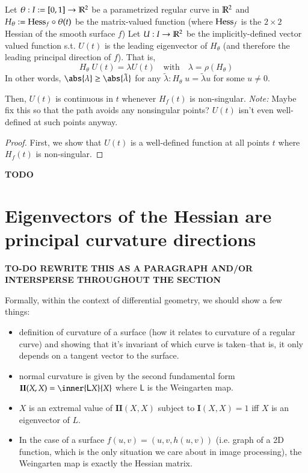         \begin{theorem}
            Let $\theta: I:= [0,1] \to \mathbb{R}^2$ be a parametrized regular curve in $\mathbb{R}^2$ and
            $H_\theta := \mathrm{Hess}_f  \circ \theta(t)$ be the matrix-valued function
            (where $\mathrm{Hess}_f$ is the $2\times 2$ Hessian of the smooth surface $f$)
            Let $U:I \to \mathbb{R}^2$ be the implicitly-defined vector valued function s.t.
            $U(t)$ is the leading eigenvector of $H_\theta$
            (and therefore the leading principal direction of $f$). That is,
            \begin{equation}
                H_\theta \; U(t) = \lambda U(t) \quad \textrm{with}\quad \lambda = \rho(H_\theta)
            \end{equation}
            In other words, $\abs{\lambda} \ge \abs{\tilde{\lambda}}$ for any
            $\tilde{\lambda} : H_\theta \; u = \tilde{\lambda} u$ for some $u \ne 0$.
            
            Then, $U(t)$ is continuous in $t$ whenever $H_f(t)$ is non-singular.
            \textit{Note:} Maybe fix this so that the path avoids any nonsingular points?
            $U(t)$ isn't even well-defined at such points anyway.
        \end{theorem}
        \begin{proof}
            First, we show that $U(t)$ is a well-defined function at all points $t$ where
            $H_f(t)$ is non-singular.
        \end{proof}

         \maltese \textbf{TODO}       

\hrulefill

\section{Eigenvectors of the Hessian are principal curvature directions}
	\maltese \textbf{TO-DO \color{red}REWRITE THIS AS A PARAGRAPH AND/OR INTERSPERSE THROUGHOUT THE SECTION}
	
	
	Formally, within the context of differential geometry, we should show a few things:
	\begin{itemize}
		\item definition of curvature of a surface (how it relates to curvature of a regular curve) and showing that it's invariant of which curve is taken--that is, it only depends on a tangent vector to the surface.
		\item normal curvature is given by the second fundamental form
			$\textbf{II}(X,X) = \inner{\mathsf{L}X}{X}$ where $\mathsf{L}$ is the Weingarten map.
		\item $X$ is an extremal value of $\textbf{II}(X,X)$ subject to $\textbf{I}(X,X) = 1 $ iff $X$ is an eigenvector of $L$.
		\item In the case of a surface $f(u,v) = (u,v,h(u,v))$ (i.e. graph of a 2D function, which is the only situation we care about in image processing), the Weingarten map is exactly the Hessian matrix.
		\end{itemize}
        
